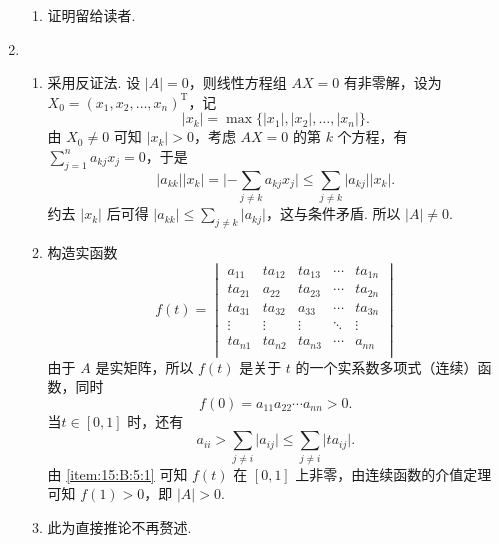 \begin{enumerate}
\begin{enumerate}
              \item 证明留给读者.
          \end{enumerate}

    \item \begin{enumerate}
              \item \label{item:15:B:5:1}
                    采用反证法. 设 $\lvert A \rvert = 0$，则线性方程组 $AX = 0$ 有非零解，设为 $X_0 = (x_1, x_2, \ldots, x_n)^{\mathrm{T}}$，记
                    \[\lvert x_k \rvert = \max \{\lvert x_1 \rvert, \lvert x_2 \rvert, \ldots, \lvert x_n \rvert\}.\]
                    由 $X_0 \neq 0$ 可知 $\lvert x_k \rvert > 0$，考虑 $AX = 0$ 的第 $k$ 个方程，有 $\displaystyle\sum_{j=1}^n a_{kj}x_j = 0$，于是
                    \[\lvert a_{kk} \rvert \lvert x_k \rvert = \lvert -\displaystyle\sum_{j \neq k}a_{kj}x_j \rvert \leqslant \displaystyle\sum_{j \neq k}\lvert a_{kj} \rvert \lvert x_k \rvert.\]
                    约去 $\lvert x_k \rvert$ 后可得 $\lvert a_{kk} \rvert \leqslant \displaystyle\sum_{j \neq k} \lvert a_{kj} \rvert$，这与条件矛盾. 所以 $\lvert A \rvert \neq 0$.

              \item 构造实函数
                    \[f(t) = \begin{vmatrix}
                            a_{11}  & ta_{12} & ta_{13} & \cdots & ta_{1n} \\
                            ta_{21} & a_{22}  & ta_{23} & \cdots & ta_{2n} \\
                            ta_{31} & ta_{32} & a_{33}  & \cdots & ta_{3n} \\
                            \vdots  & \vdots  & \vdots  & \ddots & \vdots  \\
                            ta_{n1} & ta_{n2} & ta_{n3} & \cdots & a_{nn}  \\
                        \end{vmatrix}\]
                    由于 $A$ 是实矩阵，所以 $f(t)$ 是关于 $t$ 的一个实系数多项式（连续）函数，同时
                    \[f(0) = a_{11}a_{22}\cdots a_{nn} > 0.\] 当$t \in [0, 1]$ 时，还有
                    \[a_{ii} > \sum_{j \neq i} \lvert a_{ij} \rvert \leqslant \sum_{j \neq i} \lvert ta_{ij} \rvert.\]
                    由 \ref*{item:15:B:5:1} 可知 $f(t)$ 在 $[0, 1]$ 上非零，由连续函数的介值定理可知 $f(1) > 0$，即 $\lvert A \rvert > 0$.

              \item 此为直接推论不再赘述.
          \end{enumerate}
\end{enumerate}

\clearpage
